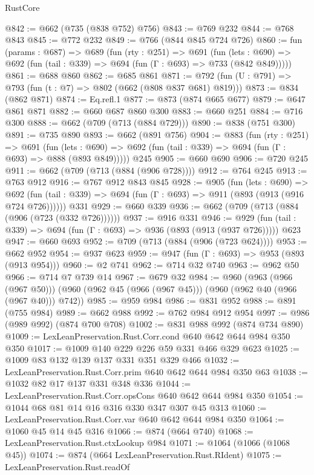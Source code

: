 \begin{lexlean}{RustCore}
\begin{coremodule}
@842 := @662 (@735 (@838 @752) @756)
@843 := @769 @232
@844 := @768 @843
@845 := @772 @232
@849 := @766 (@844 @845 @724 @726)
@860 := fun (params : @687) =>
  @689
    (fun (rty : @251) =>
    @691
      (fun (lets : @690) => @692 (fun (tail : @339) => @694 (fun (Γ : @693) => @733 (@842 @849)))))
@861 := @688 @860
@862 := @685 @861
@871 := @792 (fun (U : @791) => @793 (fun (t : @7) => @802 (@662 (@808 @837 @681) @819)))
@873 := @834 (@862 @871)
@874 := Eq.refl.{1}
@877 := @873 (@874 @665 @677)
@879 := @647 @861 @871
@882 := @660 @687 @860 @300
@883 := @660 @251
@884 := @716 @300
@888 := @662 (@709 (@713 (@884 @729)))
@890 := @838 (@751 @300)
@891 := @735 @890
@893 := @662 (@891 @756)
@904 := @883
    (fun (rty : @251) =>
    @691
      (fun (lets : @690) => @692 (fun (tail : @339) => @694 (fun (Γ : @693) => @888 (@893 @849)))))
    @245
@905 := @660 @690
@906 := @720 @245
@911 := @662 (@709 (@713 (@884 (@906 @728))))
@912 := @764 @245
@913 := @763 @912
@916 := @767 @912 @843 @845
@928 := @905
    (fun (lets : @690) =>
    @692 (fun (tail : @339) => @694 (fun (Γ : @693) => @911 (@893 (@913 (@916 @724 @726))))))
    @331
@929 := @660 @339
@936 := @662 (@709 (@713 (@884 (@906 (@723 (@332 @726))))))
@937 := @916 @331
@946 := @929 (fun (tail : @339) => @694 (fun (Γ : @693) => @936 (@893 (@913 (@937 @726))))) @623
@947 := @660 @693
@952 := @709 (@713 (@884 (@906 (@723 @624))))
@953 := @662 @952
@954 := @937 @623
@959 := @947 (fun (Γ : @693) => @953 (@893 (@913 @954)))
@960 := @2 @741
@962 := @714 @32 @740
@963 := @962 @50
@966 := @714 @7 @739 @14
@967 := @679 @32
@984 := @960
    (@963 (@966 (@967 @50)))
    (@960 (@962 @45 (@966 (@967 @45))) (@960 (@962 @40 (@966 (@967 @40))) @742))
@985 := @959 @984
@986 := @831 @952
@988 := @891 (@755 @984)
@989 := @662 @988
@992 := @762 @984 @912 @954
@997 := @986 (@989 @992) (@874 @700 @708)
@1002 := @831 @988 @992 (@874 @734 @890)
@1009 := LexLeanPreservation.Rust.Corr.cond @640 @642 @644 @984 @350 @350
@1017 := @1009 @140 @229 @226 @59 @331 @466 @329 @623
@1025 := @1009 @83 @132 @139 @137 @331 @351 @329 @466
@1032 := LexLeanPreservation.Rust.Corr.prim @640 @642 @644 @984 @350 @63
@1038 := @1032 @82 @17 @137 @331 @348 @336
@1044 := LexLeanPreservation.Rust.Corr.opsCons @640 @642 @644 @984 @350
@1054 := @1044 @68 @81 @14 @16 @316 @330 @347 @307 @45 @313
@1060 := LexLeanPreservation.Rust.Corr.var @640 @642 @644 @984 @350
@1064 := @1060 @45 @14 @45 @316
@1066 := @874 (@664 @740)
@1068 := LexLeanPreservation.Rust.ctxLookup @984
@1071 := @1064 (@1066 (@1068 @45))
@1074 := @874 (@664 LexLeanPreservation.Rust.RIdent)
@1075 := LexLeanPreservation.Rust.readOf

\end{coremodule}
\end{lexlean}
